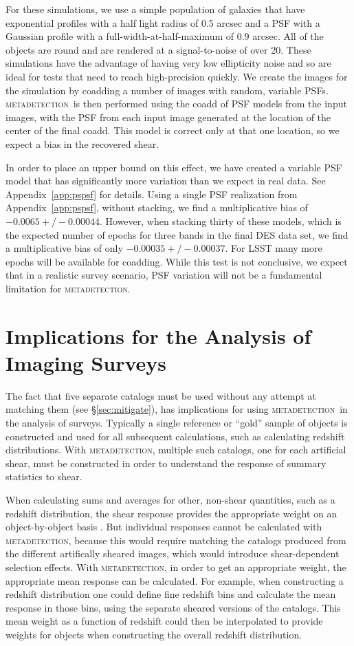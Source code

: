 \documentclass[fleqn,useAMS,usenatbib]{mnras}
\newcommand{\mdet}{\textsc{metadetection}}
\begin{document}
For these simulations, we use a simple population of galaxies that have
exponential profiles with a half light radius of 0.5 arcsec and a PSF with a
Gaussian profile with a full-width-at-half-maximum of 0.9 arcsec. All of the
objects are round and are rendered at a signal-to-noise of over 20. These
simulations have the advantage of having very low ellipticity noise and so are
ideal for tests that need to reach high-precision quickly. We create the images
for the simulation by coadding a number of images with random, variable PSFs.
\mdet\ is then performed using the coadd of PSF models from the input images,
with the PSF from each input image generated at the location of the center of
the final coadd.  This model is correct only at that one location, so we
expect a bias in the recovered shear.

In order to place an upper bound on this effect, we have created a variable PSF
model that has significantly more variation than we expect in real data. See
Appendix~\ref{app:pspsf} for details.  Using a single PSF realization from
Appendix~\ref{app:pspsf}, without stacking, we find a multiplicative bias of
$-0.0065 +/- 0.00044$.  However, when stacking thirty of these models, which is
the expected number of epochs for three bands in the final DES data set, we
find a multiplicative bias of only $-0.00035 +/- 0.00037$.  For LSST many more
epochs will be available for coadding.   While this test is not conclusive, we
expect that in a realistic survey scenario, PSF variation will not be a
fundamental limitation for \mdet.

\section{Implications for the Analysis of Imaging Surveys} \label{sec:wavg}

The fact that five separate catalogs must be used without any attempt at
matching them (see \S \ref{sec:mitigate}), has implications for using \mdet\ in
the analysis of surveys.  Typically a single reference or ``gold'' sample of
objects is constructed and used for all subsequent calculations, such as
calculating redshift distributions.  With \mdet, multiple such catalogs, one
for each artificial shear, must be constructed in order to understand the
response of summary statistics to shear.

When calculating sums and averages for other, non-shear quantities, such as a
redshift distribution, the shear response provides the appropriate weight on an
object-by-object basis \citep{SheldonMcal2017}.  But individual responses
cannot be calculated with \mdet, because this would require matching the
catalogs produced from the different artifically sheared images, which would
introduce shear-dependent selection effects.  With \mdet, in order to get an
appropriate weight, the appropriate mean response can be calculated.  For
example, when constructing a redshift distribution one could define fine
redshift bins and calculate the mean response in those bins, using the separate
sheared versions of the catalogs. This mean weight as a function of redshift
could then be interpolated to provide weights for objects when constructing the
overall redshift distribution.
\end{document}
